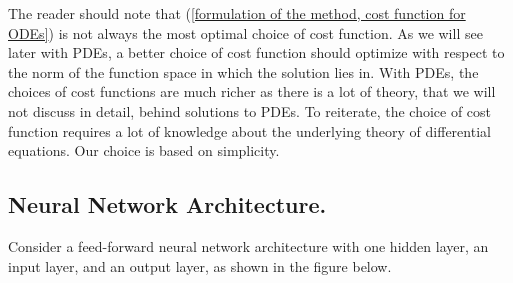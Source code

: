 \documentclass[10pt]{article}
\theoremstyle{plain}
\theoremstyle{definition}
\theoremstyle{remark}
\numberwithin{theorem}{section}
\numberwithin{proposition}{section}
\numberwithin{remark}{section}
\numberwithin{corollary}{section}
\numberwithin{definition}{section}
\numberwithin{lemma}{section}
\numberwithin{equation}{section}
\begin{document}
The reader should note that (\ref{formulation of the method, cost function for ODEs}) is not always the most optimal choice of cost function. As we will see later with PDEs, a better choice of cost function should optimize with respect to the norm of the function space in which the solution lies in. With PDEs, the choices of cost functions are much richer as there is a lot of theory, that we will not discuss in detail, behind solutions to PDEs. To reiterate, the choice of cost function requires a lot of knowledge about the underlying theory of differential equations. Our choice is based on simplicity. 

\subsection{Neural Network Architecture.}
Consider a feed-forward neural network architecture with one hidden layer, an input layer, and an output layer, as shown in the figure below. 
\vspace{0.5in}
\end{document}
